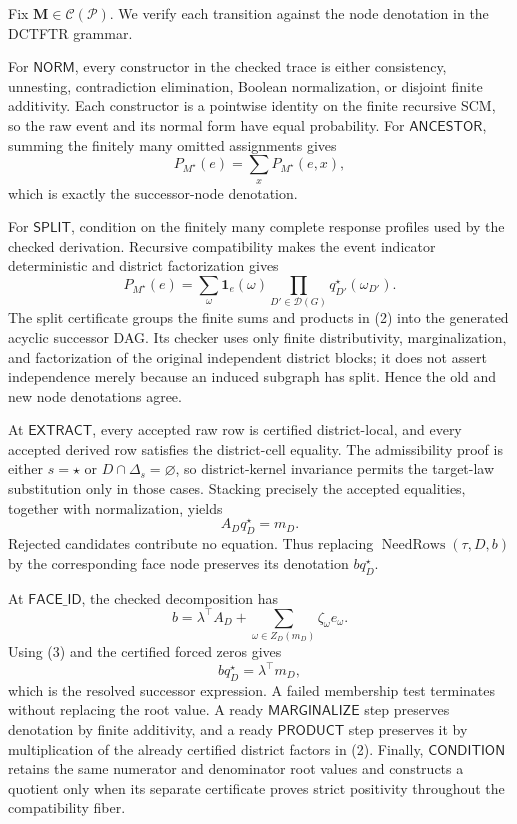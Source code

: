 Fix \(\mathbf M\in\mathcal C(\mathcal P)\). We verify each transition against the node denotation in the DCTFTR grammar.

For \(\mathsf{NORM}\), every constructor in the checked trace is either consistency, unnesting, contradiction elimination, Boolean normalization, or disjoint finite additivity. Each constructor is a pointwise identity on the finite recursive SCM, so the raw event and its normal form have equal probability. For \(\mathsf{ANCESTOR}\), summing the finitely many omitted assignments gives
\[
P_{M^\star}(e)=\sum_xP_{M^\star}(e,x),\tag{1}
\]
which is exactly the successor-node denotation.

For \(\mathsf{SPLIT}\), condition on the finitely many complete response profiles used by the checked derivation. Recursive compatibility makes the event indicator deterministic and district factorization gives
\[
P_{M^\star}(e)
=\sum_{\omega}\mathbf 1_e(\omega)
\prod_{D'\in\mathcal D(G)}q_{D'}^\star(\omega_{D'}).\tag{2}
\]
The split certificate groups the finite sums and products in (2) into the generated acyclic successor DAG. Its checker uses only finite distributivity, marginalization, and factorization of the original independent district blocks; it does not assert independence merely because an induced subgraph has split. Hence the old and new node denotations agree.

At \(\mathsf{EXTRACT}\), every accepted raw row is certified district-local, and every accepted derived row satisfies the district-cell equality. The admissibility proof is either \(s=\star\) or \(D\cap\Delta_s=\varnothing\), so district-kernel invariance permits the target-law substitution only in those cases. Stacking precisely the accepted equalities, together with normalization, yields
\[
A_Dq_D^\star=m_D.\tag{3}
\]
Rejected candidates contribute no equation. Thus replacing \(\operatorname{NeedRows}(\tau,D,b)\) by the corresponding face node preserves its denotation \(bq_D^\star\).

At \(\mathsf{FACE\_ID}\), the checked decomposition has
\[
b=\lambda^\top A_D+\sum_{\omega\in Z_D(m_D)}\zeta_\omega e_\omega.
\]
Using (3) and the certified forced zeros gives
\[
bq_D^\star=\lambda^\top m_D,\tag{4}
\]
which is the resolved successor expression. A failed membership test terminates without replacing the root value. A ready \(\mathsf{MARGINALIZE}\) step preserves denotation by finite additivity, and a ready \(\mathsf{PRODUCT}\) step preserves it by multiplication of the already certified district factors in (2). Finally, \(\mathsf{CONDITION}\) retains the same numerator and denominator root values and constructs a quotient only when its separate certificate proves strict positivity throughout the compatibility fiber.

